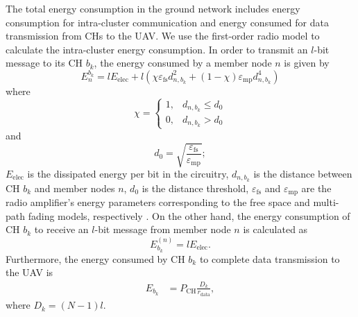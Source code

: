 \documentclass[journal]{IEEEtran}
\begin{document}
	The total energy consumption in the ground network includes energy consumption for intra-cluster communication and energy consumed for data transmission from CHs to the UAV. We use the first-order radio model \cite{W. R. Heinzelman} to calculate the intra-cluster energy consumption. In order to transmit an $l$-bit message to its CH $b_k$, the energy consumed by a member node $n$ is given by \cite{W. R. Heinzelman}
	\begin{equation}
	\label{groundenergy}
	E_{n}^{b_k} = lE_{\text{elec}} + l\left(\chi \varepsilon_\text{fs}d_{n,b_k}^2 + \left(1 - \chi \right) \varepsilon_\text{mp}d_{n,b_k}^4 \right)
	\end{equation}
	where
	\begin{equation}
	\chi = \left\{ \begin{array}{ll}
	1, & d_{n,b_k} \leq d_0 \\
	0, & d_{n,b_k} > d_0
	\end{array} \right.
	\end{equation}
	and
	\begin{equation}
	d_0 = \sqrt{\frac{\varepsilon_\text{fs}}{\varepsilon_\text{mp}}};
	\end{equation}
	$E_{\text{elec}}$ is the dissipated energy per bit in the circuitry, $d_{n,b_k}$ is the distance between CH $b_k$ and member nodes $n$, $d_0$ is the distance threshold, $\varepsilon_\text{fs}$ and $\varepsilon_\text{mp}$ are the radio amplifier's energy parameters corresponding to the free space and multi-path fading models, respectively \cite{W. Heinzelman dissertstion}. On the other hand, the energy consumption of CH $b_k$ to receive an $l$-bit message from member node $n$ is calculated as\cite{W. R. Heinzelman}
	\begin{equation}
	E_{b_k}^{(n)} = lE_{\text{elec}}.
	\end{equation}
	Furthermore, the energy consumed by CH $b_k$ to complete data transmission to the UAV is
	\begin{align}
	   E_{b_k} &= P_{\text{CH}}\frac{D_k}{r_{\text{data}}},
	\end{align}
where $D_k = (N-1)l$.
	
\end{document}
